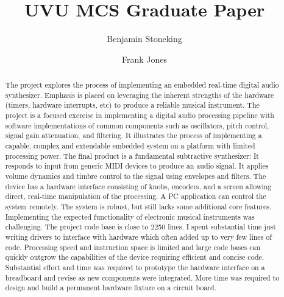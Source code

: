\documentclass[acmlarge,screen]{acmart}
\begin{document}
\title{UVU MCS Graduate Paper}


\author{Benjamin Stoneking}

\author{Frank Jones}

\renewcommand{\shortauthors}{Candidate First Last}

\begin{abstract}
	The project explores the process of implementing an embedded real-time digital audio synthesizer. Emphasis is placed on leveraging the inherent strengths of the hardware (timers, hardware interrupts, etc) to produce a reliable musical instrument. The project is a focused exercise in implementing a digital audio processing pipeline with software implementations of common components such as oscillators, pitch control, signal gain attenuation, and filtering. It illustrates the process of implementing a capable, complex and extendable embedded system on a platform with limited processing power. The final product is a fundamental subtractive synthesizer: It responds to input from generic MIDI devices to produce an audio signal. It applies volume dynamics and timbre control to the signal using envelopes and filters. The device has a hardware interface consisting of knobs, encoders, and a screen allowing direct, real-time manipulation of the processing. A PC application can control the system remotely. The system is robust, but still lacks some additional core features. Implementing the expected functionality of electronic musical instruments was challenging. The project code base is close to 2250 lines. I spent substantial time just writing drivers to interface with hardware which often added up to very few lines of code. Processing speed and instruction space is limited and large code bases can quickly outgrow the capabilities of the device requiring efficient and concise code. Substantial effort and time was required to prototype the hardware interface on a breadboard and revise as new components were integrated. More time was required to design and build a permanent hardware fixture on a circuit board.
\end{abstract}
\end{document}

